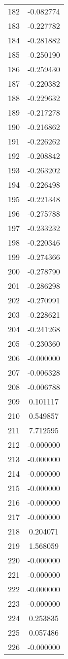 \documentclass[12pt]{article}
\begin{document}
\begin{longtable}{@{}cc@{}}
182 & -0.082774 \\
183 & -0.227782 \\
184 & -0.281882 \\
185 & -0.250190 \\
186 & -0.259430 \\
187 & -0.220382 \\
188 & -0.229632 \\
189 & -0.217278 \\
190 & -0.216862 \\
191 & -0.226262 \\
192 & -0.208842 \\
193 & -0.263202 \\
194 & -0.226498 \\
195 & -0.221348 \\
196 & -0.275788 \\
197 & -0.233232 \\
198 & -0.220346 \\
199 & -0.274366 \\
200 & -0.278790 \\
201 & -0.286298 \\
202 & -0.270991 \\
203 & -0.228621 \\
204 & -0.241268 \\
205 & -0.230360 \\
206 & -0.000000 \\
207 & -0.006328 \\
208 & -0.006788 \\
209 & 0.101117 \\
210 & 0.549857 \\
211 & 7.712595 \\
212 & -0.000000 \\
213 & -0.000000 \\
214 & -0.000000 \\
215 & -0.000000 \\
216 & -0.000000 \\
217 & -0.000000 \\
218 & 0.204071 \\
219 & 1.568059 \\
220 & -0.000000 \\
221 & -0.000000 \\
222 & -0.000000 \\
223 & -0.000000 \\
224 & 0.253835 \\
225 & 0.057486 \\
226 & -0.000000 \\

\end{longtable}
\end{document}
